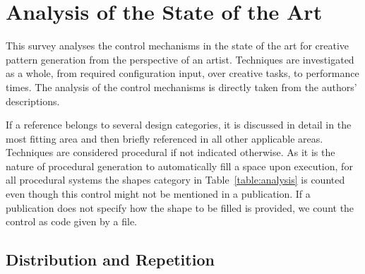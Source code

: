 

\section{Analysis of the State of the Art}
\label{sec:analysis}

This survey analyses the control mechanisms in the state of the art for creative pattern generation from the perspective of an artist. Techniques are investigated as a whole, from required configuration input, over creative tasks, to performance times. The analysis of the control mechanisms is directly taken from the authors' descriptions. 


If a reference belongs to several design categories, it is discussed in detail in the most fitting area and then briefly referenced in all other applicable areas. Techniques are considered procedural if not indicated otherwise. As it is the nature of procedural generation to automatically fill a space upon execution, for all procedural systems the shapes category in Table~\ref{table:analysis} is counted even though this control might not be mentioned in a publication. 
If a publication does not specify how the shape to be filled is provided, we count the control as code given by a file.

\subsection{Distribution and Repetition}
\label{subsec:analysis_distribution_and_repetition}

